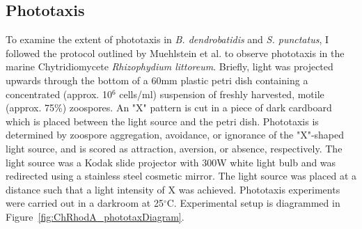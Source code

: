 \subsection*{Phototaxis}
To examine the extent of phototaxis in \textit{B. dendrobatidis} and \textit{S. punctatus}, I followed the protocol outlined by Muehlstein et al.\nocite{Muehlstein1987} to observe phototaxis in the marine Chytridiomycete \textit{Rhizophydium littoreum}. Briefly, light was projected upwards through the bottom of a 60mm plastic petri dish containing a concentrated (approx. 10$^{6}$ cells/ml) suspension of freshly harvested, motile (approx. 75\%) zoospores. An "X" pattern is cut in a piece of dark cardboard which is placed between the light source and the petri dish. Phototaxis is determined by zoospore aggregation, avoidance, or ignorance of the "X"-shaped light source, and is scored as attraction, aversion, or absence, respectively. The light source was a Kodak slide projector with 300W white light bulb and was redirected using a stainless steel cosmetic mirror. The light source was placed at a distance such that a light intensity of X was achieved. Phototaxis experiments were carried out in a darkroom at 25$^{\circ}$C. Experimental setup is diagrammed in Figure~\ref{fig:ChRhodA_phototaxDiagram}.\\ 
